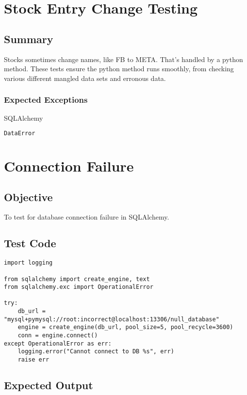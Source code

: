\documentclass[12pt]{article}
\begin{document}
\section {Stock Entry Change Testing}

\subsection{Summary}

Stocks sometimes change names, like FB to META. That's handled by a python method. These tests ensure the python method runs smoothly, from checking various different mangled data sets and erronous data.

\subsubsection{Expected Exceptions}

SQLAlchemy 

\begin{verbatim}
DataError
\end{verbatim}

\section{Connection Failure}

\subsection{Objective}

To test for database connection failure in SQLAlchemy.

\subsection{Test Code}

\begin{verbatim}
import logging

from sqlalchemy import create_engine, text
from sqlalchemy.exc import OperationalError

try:
    db_url = "mysql+pymysql://root:incorrect@localhost:13306/null_database"
    engine = create_engine(db_url, pool_size=5, pool_recycle=3600)
    conn = engine.connect()
except OperationalError as err:
    logging.error("Cannot connect to DB %s", err)
    raise err

\end{verbatim}

\subsection{Expected Output}
\end{document}
